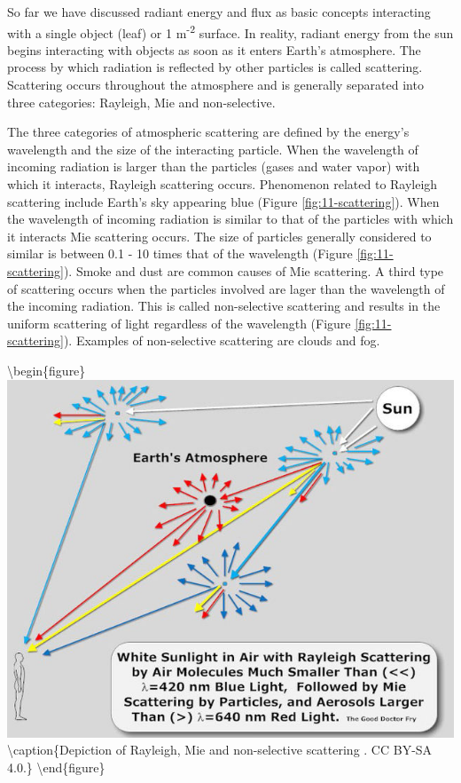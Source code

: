 \documentclass[
]{book}
\begin{document}
So far we have discussed radiant energy and flux as basic concepts
interacting with a single object (leaf) or 1 m\textsuperscript{-2} surface. In reality,
radiant energy from the sun begins interacting with objects as soon
as it enters Earth's atmosphere. The process by which radiation is
reflected by other particles is called scattering. Scattering occurs
throughout the atmosphere and is generally separated into three
categories: Rayleigh, Mie and non-selective.

The three categories of atmospheric scattering are defined by the
energy's wavelength and the size of the interacting particle. When
the wavelength of incoming radiation is larger than the particles
(gases and water vapor) with which it interacts, Rayleigh scattering
occurs. Phenomenon related to Rayleigh scattering include Earth's sky
appearing blue (Figure \ref{fig:11-scattering}). When the wavelength of
incoming radiation is similar to that of the particles with which it
interacts Mie scattering occurs. The size of particles generally
considered to similar is between 0.1 - 10 times that of the wavelength
(Figure \ref{fig:11-scattering}). Smoke and dust are common causes of
Mie scattering. A third type of scattering occurs when the particles
involved are lager than the wavelength of the incoming radiation.
This is called non-selective scattering and results in the uniform
scattering of light regardless of the wavelength (Figure
\ref{fig:11-scattering}). Examples of non-selective scattering are
clouds and fog.

\textbackslash begin\{figure\}
\includegraphics[width=8.89in]{images/11-scattering} \textbackslash caption\{Depiction of Rayleigh, Mie and non-selective scattering \citep{the_good_doctor_fry_diagram_2011}. CC BY-SA 4.0.\}\label{fig:11-scattering}
\textbackslash end\{figure\}
\end{document}
